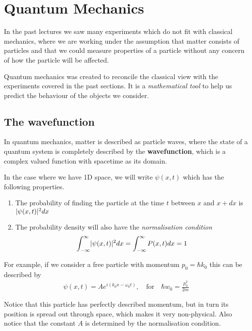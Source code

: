 \section{Quantum Mechanics}
In the past lectures we saw many experiments which do not fit with classical mechanics, where we are working under the assumption that matter consists of particles and that we could measure properties of a particle without any concern of how the particle will be affected.

Quantum mechanics was created to reconcile the classical view with the experiments covered in the past sections. It is a \emph{mathematical tool} to help us predict the behaviour of the objects we consider.


\subsection{The wavefunction}
In quantum mechanics, matter is described as particle waves, where the state of a quantum system is completely described by the \textbf{wavefunction}, which is a complex valued function with spacetime as its domain.

In the case where we have 1D space, we will write $\psi(x,t)$ which has the following properties.

\begin{enumerate}
	\item The probability of finding the particle at the time $t$ between $x$ and $x + dx$ is $\vert\psi(x,t)\vert^2 dx$

	\item The probability density will also have the \emph{normalisation condition}
		\begin{align*}
			\int_{-\infty}^{\infty} \abs{\psi(x,t)}^2 dx = \int_{-\infty}^{\infty}P(x,t)dx = 1
		\end{align*}
\end{enumerate}

For example, if we consider a free particle with momentum $p_0 = \hbar k_0$ this can be described by
\begin{align*}
	\psi(x,t) = A e^{i(k_0x - \omega_0 t)}, \quad \text{for} \quad \hbar w_0 = \frac{p_0^2}{2m}
\end{align*}

Notice that this particle has perfectly described momentum, but in turn its position is spread out through space, which makes it very non-physical. Also notice that the constant $A$ is determined by the normalisation condition.

